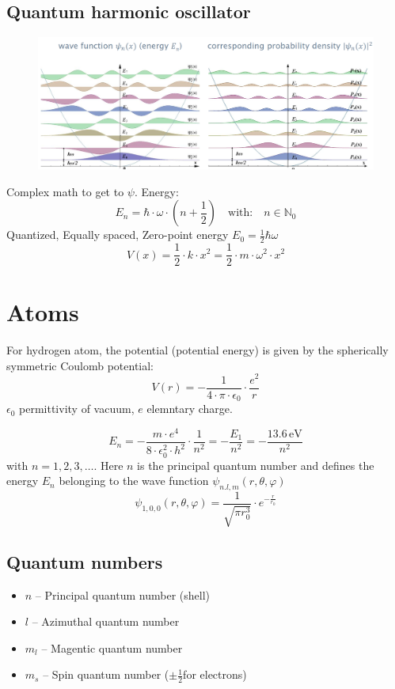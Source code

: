 \subsection{Quantum harmonic oscillator}
\begin{figure}[h]
    \centering
    \includegraphics[width=\columnwidth]{images/harmoicoszillator.png}
    \label{fig:harmoszi}
\end{figure}
Complex math to get to \(\psi\).
Energy:
\begin{equation*}
    E_n = \hbar \cdot \omega\cdot (n + \frac{1}{2})\quad \text{with:}\quad n \in \mathbb{N}_0
\end{equation*}
Quantized, Equally spaced, Zero-point energy \(E_0 = \frac{1}{2}\hbar\omega\)
\begin{equation*}
    V(x) = \frac{1}{2}\cdot k \cdot x^2 = \frac{1}{2}\cdot m\cdot \omega^2 \cdot x^2
\end{equation*}
\section{Atoms}
For hydrogen atom, the potential (potential energy) is given by the spherically symmetric Coulomb potential:
\begin{equation*}
    V(r) = - \frac{1}{4\cdot \pi \cdot \epsilon_0}\cdot\frac{e^2}{r}
\end{equation*}
\(\epsilon_0\) permittivity of vacuum, \(e\) elemntary charge.

\begin{equation*}
    E_n = -\frac{m\cdot e^4}{8 \cdot \epsilon_0^2 \cdot h^2}\cdot\frac{1}{n^2}
    = -\frac{E_1}{n^2} = -\frac{13.6 \,\text{eV}}{n^2} 
\end{equation*}
with \(n = 1,2,3,\dots\).
Here \(n\) is the principal quantum number and defines the energy \(E_n\) belonging to the wave function \(\psi_{n.l,m}(r,\theta,\varphi)\)
\[
\psi_{1,0,0}(r,\theta,\varphi) = \frac{1}{\sqrt{\pi r_0^3}}\cdot e^{-\frac{r}{r_0}}
\]
\subsection{Quantum numbers}
\begin{itemize}
    \item \(n\) -- Principal quantum number (shell)
    \item \(l\) -- Azimuthal quantum number
    \item \(m_l\) -- Magentic quantum number
    \item \(m_s\) -- Spin quantum number (\(\pm \frac{1}{2}\)for electrons)
\end{itemize}

